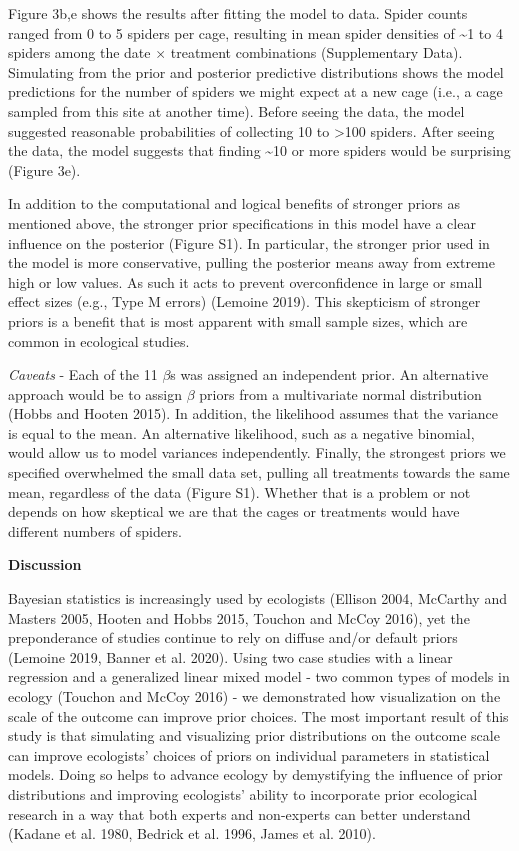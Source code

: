 \documentclass[
  12pt,
]{article}
\begin{document}
Figure 3b,e shows the results after fitting the model to data. Spider
counts ranged from 0 to 5 spiders per cage, resulting in mean spider
densities of \textasciitilde1 to 4 spiders among the date \(\times\)
treatment combinations (Supplementary Data). Simulating from the prior
and posterior predictive distributions shows the model predictions for
the number of spiders we might expect at a new cage (i.e., a cage
sampled from this site at another time). Before seeing the data, the
model suggested reasonable probabilities of collecting 10 to
\textgreater100 spiders. After seeing the data, the model suggests that
finding \textasciitilde10 or more spiders would be surprising (Figure
3e).

In addition to the computational and logical benefits of stronger priors
as mentioned above, the stronger prior specifications in this model have
a clear influence on the posterior (Figure S1). In particular, the
stronger prior used in the model is more conservative, pulling the
posterior means away from extreme high or low values. As such it acts to
prevent overconfidence in large or small effect sizes (e.g., Type M
errors) (Lemoine 2019). This skepticism of stronger priors is a benefit
that is most apparent with small sample sizes, which are common in
ecological studies.

\emph{Caveats} - Each of the 11 \(\beta\)s was assigned an independent
prior. An alternative approach would be to assign \(\beta\) priors from
a multivariate normal distribution (Hobbs and Hooten 2015). In addition,
the likelihood assumes that the variance is equal to the mean. An
alternative likelihood, such as a negative binomial, would allow us to
model variances independently. Finally, the strongest priors we
specified overwhelmed the small data set, pulling all treatments towards
the same mean, regardless of the data (Figure S1). Whether that is a
problem or not depends on how skeptical we are that the cages or
treatments would have different numbers of spiders.

\textbf{Discussion}

Bayesian statistics is increasingly used by ecologists (Ellison 2004,
McCarthy and Masters 2005, Hooten and Hobbs 2015, Touchon and McCoy
2016), yet the preponderance of studies continue to rely on diffuse
and/or default priors (Lemoine 2019, Banner et al. 2020). Using two case
studies with a linear regression and a generalized linear mixed model -
two common types of models in ecology (Touchon and McCoy 2016) - we
demonstrated how visualization on the scale of the outcome can improve
prior choices. The most important result of this study is that
simulating and visualizing prior distributions on the outcome scale can
improve ecologists' choices of priors on individual parameters in
statistical models. Doing so helps to advance ecology by demystifying
the influence of prior distributions and improving ecologists' ability
to incorporate prior ecological research in a way that both experts and
non-experts can better understand (Kadane et al. 1980, Bedrick et al.
1996, James et al. 2010).
\end{document}
